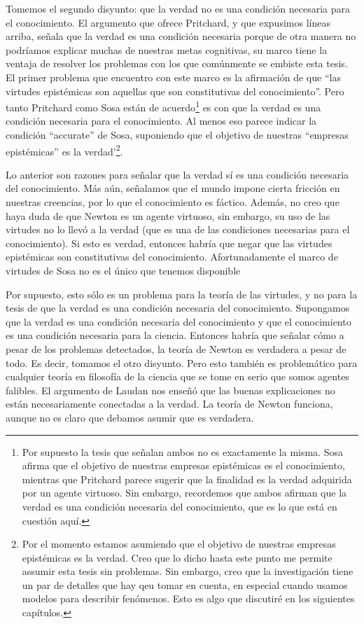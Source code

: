 \documentclass{article}
\begin{document}
Tomemos el segundo disyunto: que la verdad no es una condición necesaria para el conocimiento. El argumento que ofrece Pritchard, y que expusimos líneas arriba, señala que la verdad es una condición necesaria porque de otra manera no podríamos explicar muchas de nuestras metas cognitivas, su marco tiene la ventaja de resolver los problemas con los que comúnmente se embiste esta tesis. El primer problema que encuentro con este marco es la afirmación de que ``las virtudes epistémicas son aquellas que son constitutivas del conocimiento''. Pero tanto Pritchard como Sosa están de acuerdo\footnote{Por supuesto la tesis que señalan ambos no es exactamente la misma. Sosa afirma que el objetivo de nuestras empresas epistémicas es el conocimiento, mientras que Pritchard parece sugerir que la finalidad es la verdad adquirida por un agente virtuoso. Sin embargo, recordemos que ambos afirman que la verdad es una condición necesaria del conocimiento, que es lo que está en cuestión aquí.} es con que la verdad es una condición necesaria para el conocimiento. Al menos eso parece indicar la condición ``accurate'' de Sosa, suponiendo que el objetivo de nuestras ``empresas epistémicas'' es la verdad'\footnote{Por el momento estamos asumiendo que el objetivo de nuestras empresas epistémicas es la verdad. Creo que lo dicho hasta este punto me permite assumir esta tesis sin problemas. Sin embargo, creo que la investigación tiene un par de detalles que hay qeu tomar en cuenta, en especial cuando usamos modelos para describir fenómenos. Esto es algo que discutiré en los siguientes capítulos.}. 

Lo anterior son razones para señalar que la verdad sí es una condición necesaria del conocimiento. Más aún, señalamos que el mundo impone cierta fricción en nuestras creencias, por lo que el conocimiento es fáctico. Además, no creo que haya duda de que Newton es un agente virtuoso, sin embargo, su uso de las virtudes no lo llevó a la verdad (que es una de las condiciones necesarias para el conocimiento). Si esto es verdad, entonces habría que negar que las virtudes epistémicas son constitutivas del conocimiento. Afortunadamente el marco de virtudes de Sosa no es el único que tenemos disponible

Por supuesto, esto sólo es un problema para la teoría de las virtudes, y no para la tesis de que la verdad es una condición necesaria del conocimiento. Supongamos que la verdad es una condición necesaria del conocimiento y que el conocimiento es una condición necesaria para la ciencia. Entonces habría que señalar cómo a pesar de los problemas detectados, la teoría de Newton es verdadera a pesar de todo. Es decir, tomamos el otro disyunto. Pero esto también es problemático para cualquier teoría en filosofía de la ciencia que se tome en serio que somos agentes falibles. El argumento de Laudan \citeyear{Laudan1981} nos enseñó que las buenas explicaciones no están necesariamente conectadas a la verdad. La teoría de Newton funciona, aunque no es claro que debamos asumir que es verdadera.
\end{document}
